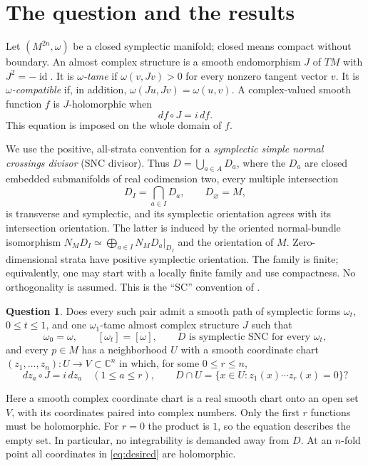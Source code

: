 \documentclass[11pt]{article}
\theoremstyle{definition}
\newtheorem{question}[theorem]{Question}
\theoremstyle{remark}
\newcommand{\C}{\mathbb C}
\newcommand{\id}{\operatorname{id}}
\begin{document}
\section{The question and the results}

Let $(M^{2n},\omega)$ be a closed symplectic manifold; closed means compact without boundary. An almost complex structure is a smooth endomorphism $J$ of $TM$ with $J^2=-\id$. It is \emph{$\omega$-tame} if $\omega(v,Jv)>0$ for every nonzero tangent vector $v$. It is \emph{$\omega$-compatible} if, in addition, $\omega(Ju,Jv)=\omega(u,v)$. A complex-valued smooth function $f$ is $J$-holomorphic when
\begin{equation}\label{eq:holomorphic}
 df\circ J=i\,df.
\end{equation}
This equation is imposed on the whole domain of $f$.

We use the positive, all-strata convention for a \emph{symplectic simple normal crossings divisor} (SNC divisor). Thus $D=\bigcup_{a\in A}D_a$, where the $D_a$ are closed embedded submanifolds of real codimension two, every multiple intersection
\[
 D_I=\bigcap_{a\in I}D_a,\qquad D_\varnothing=M,
\]
is transverse and symplectic, and its symplectic orientation agrees with its intersection orientation. The latter is induced by the oriented normal-bundle isomorphism
$N_MD_I\simeq\bigoplus_{a\in I}N_MD_a|_{D_I}$ and the orientation of $M$.
Zero-dimensional strata have positive symplectic orientation. The family is finite; equivalently, one may start with a locally finite family and use compactness. No orthogonality is assumed. This is the ``SC'' convention of \cite[Definition 2.1]{TMZ}.

\begin{question}\label{q:main}
Does every such pair admit a smooth path of symplectic forms $\omega_t$, $0\leq t\leq1$, and one $\omega_1$-tame almost complex structure $J$ such that
\[
 \omega_0=\omega,\qquad [\omega_t]=[\omega],
 \qquad D\text{ is symplectic SNC for every }\omega_t,
\]
and every $p\in M$ has a neighborhood $U$ with a smooth coordinate chart $(z_1,\ldots,z_n):U\to V\subset\C^n$ in which, for some $0\leq r\leq n$,
\begin{equation}\label{eq:desired}
 dz_a\circ J=i\,dz_a\quad(1\leq a\leq r),
 \qquad D\cap U=\{x\in U:z_1(x)\cdots z_r(x)=0\}?
\end{equation}
\end{question}
Here a smooth complex coordinate chart is a real smooth chart onto an open set $V$, with its coordinates paired into complex numbers. Only the first $r$ functions must be holomorphic. For $r=0$ the product is $1$, so the equation describes the empty set. In particular, no integrability is demanded away from $D$. At an $n$-fold point all coordinates in \eqref{eq:desired} are holomorphic.
\end{document}
